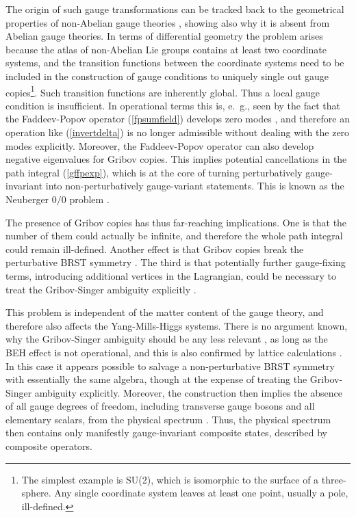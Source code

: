 \documentclass[final,12pt]{article}
\newcommand*{\pref}[1]{(\ref{#1})}
\newcommand*{\1}{1\!\!\!\bot}
\begin{document}
The origin of such gauge transformations can be tracked back to the geometrical properties of non-Abelian gauge theories \cite{Singer:1978dk}, showing also why it is absent from Abelian gauge theories. In terms of differential geometry the problem arises because the atlas of non-Abelian Lie groups contains at least two coordinate systems, and the transition functions between the coordinate systems need to be included in the construction of gauge conditions to uniquely single out gauge copies\footnote{The simplest example is SU(2), which is isomorphic to the surface of a three-sphere. Any single coordinate system leaves at least one point, usually a pole, ill-defined.}. Such transition functions are inherently global. Thus a local gauge condition is insufficient. In operational terms this is, e.\ g., seen by the fact that the Faddeev-Popov operator \pref{fpsumfield} develops zero modes \cite{Gribov:1977wm,Sobreiro:2005ec,Vandersickel:2012tg,Maas:2005qt}, and therefore an operation like \pref{invertdelta} is no longer admissible without dealing with the zero modes explicitly. Moreover, the Faddeev-Popov operator can also develop negative eigenvalues for Gribov copies. This implies potential cancellations in the path integral \pref{gffpexp}, which is at the core of turning perturbatively gauge-invariant into non-perturbatively gauge-variant statements. This is known as the Neuberger $0/0$ problem \cite{Neuberger:1986xz}.

The presence of Gribov copies has thus far-reaching implications. One is that the number of them could actually be infinite, and therefore the whole path integral could remain ill-defined. Another effect is that Gribov copies break the perturbative BRST symmetry \cite{Fujikawa:1982ss,Sorella:2009vt,Maas:2012ct}. The third is that potentially further gauge-fixing terms, introducing additional vertices in the Lagrangian, could be necessary to treat the Gribov-Singer ambiguity explicitly \cite{Maas:2011se,Vandersickel:2012tg,Serreau:2012cg}.

This problem is independent of the matter content of the gauge theory, and therefore also affects the Yang-Mills-Higgs systems. There is no argument known, why the Gribov-Singer ambiguity should be any less relevant \cite{Lenz:1994tb,Lenz:2000zt,Maas:2011se,Maas:2010nc,Capri:2012ah,Capri:2012cr,Capri:2013oja,Capri:2013gha,Capri:2016gut,Greensite:2004ke}, as long as the BEH effect is not operational, and this is also confirmed by lattice calculations \cite{Maas:2010nc}. In this case it appears possible to salvage a non-perturbative BRST symmetry \cite{Maas:2012ct,Sorella:2009vt,vonSmekal:2008ws,Dudal:2009xh,Kondo:2009ug,Dudal:2010fq,Kondo:2009gc,Boucaud:2009sd,Sorella:2010it,Neuberger:1986xz,vonSmekal:2007ns,vonSmekal:2008es,Fischer:2008uz} with essentially the same algebra, though at the expense of treating the Gribov-Singer ambiguity explicitly. Moreover, the construction then implies the absence of all gauge degrees of freedom, including transverse gauge bosons and all elementary scalars, from the physical spectrum \cite{Kugo:1979gm,Fischer:2008uz,Maas:2011se}. Thus, the physical spectrum then contains only manifestly gauge-invariant composite states, described by composite operators.
\end{document}
